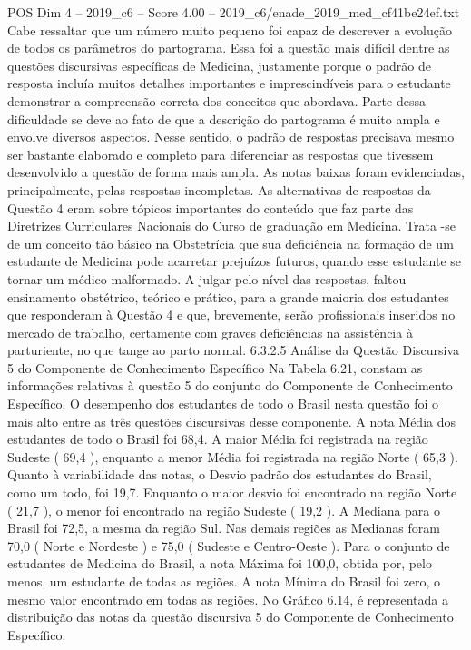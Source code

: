 \begin{textsample}{POS Dim 4 – 2019\_c6 – Score 4.00 – 2019\_c6/enade\_2019\_med\_cf41be24ef.txt}
Cabe ressaltar que um número muito pequeno foi capaz de descrever a evolução de todos os parâmetros do partograma.
Essa foi a questão mais difícil dentre as questões discursivas específicas de Medicina, justamente porque o padrão de resposta incluía muitos detalhes importantes e imprescindíveis para o estudante demonstrar a compreensão correta dos conceitos que abordava.
Parte dessa dificuldade se deve ao fato de que a descrição do partograma é muito ampla e envolve diversos aspectos.
Nesse sentido, o padrão de respostas precisava mesmo ser bastante elaborado e completo para diferenciar as respostas que tivessem desenvolvido a questão de forma mais ampla.
As notas baixas foram evidenciadas, principalmente, pelas respostas incompletas.
As alternativas de respostas da Questão 4 eram sobre tópicos importantes do conteúdo que faz parte das Diretrizes Curriculares Nacionais do Curso de graduação em Medicina.
Trata -se de um conceito tão básico na Obstetrícia que sua deficiência na formação de um estudante de Medicina pode acarretar prejuízos futuros, quando esse estudante se tornar um médico malformado.
A julgar pelo nível das respostas, faltou ensinamento obstétrico, teórico e prático, para a grande maioria dos estudantes que responderam à Questão 4 e que, brevemente, serão profissionais inseridos no mercado de trabalho, certamente com graves deficiências na assistência à parturiente, no que tange ao parto normal. 6.3.2.5 Análise da Questão Discursiva 5 do Componente de Conhecimento Específico Na Tabela 6.21, constam as informações relativas à questão 5 do conjunto do Componente de Conhecimento Específico.
O desempenho dos estudantes de todo o Brasil nesta questão foi o mais alto entre as três questões discursivas desse componente.
A nota Média dos estudantes de todo o Brasil foi 68,4.
A maior Média foi registrada na região Sudeste ( 69,4 ), enquanto a menor Média foi registrada na região Norte ( 65,3 ).
Quanto à variabilidade das notas, o Desvio padrão dos estudantes do Brasil, como um todo, foi 19,7.
Enquanto o maior desvio foi encontrado na região Norte ( 21,7 ), o menor foi encontrado na região Sudeste ( 19,2 ).
A Mediana para o Brasil foi 72,5, a mesma da região Sul.
Nas demais regiões as Medianas foram 70,0 ( Norte e Nordeste ) e 75,0 ( Sudeste e Centro-Oeste ).
Para o conjunto de estudantes de Medicina do Brasil, a nota Máxima foi 100,0, obtida por, pelo menos, um estudante de todas as regiões.
A nota Mínima do Brasil foi zero, o mesmo valor encontrado em todas as regiões.
No Gráfico 6.14, é representada a distribuição das notas da questão discursiva 5 do Componente de Conhecimento Específico.

\end{textsample}
